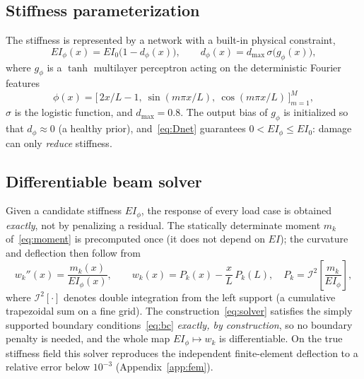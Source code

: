 \documentclass[11pt]{article}
\newcommand{\EI}{\mathit{EI}}
\begin{document}
\subsection{Stiffness parameterization}
The stiffness is represented by a network with a built-in physical constraint,
\begin{equation}
  \EI_\phi(x) = \EI_0\bigl(1 - d_\phi(x)\bigr), \qquad
  d_\phi(x) = d_{\max}\,\sigma\!\bigl(g_\phi(x)\bigr),
  \label{eq:Dnet}
\end{equation}
where $g_\phi$ is a $\tanh$ multilayer perceptron acting on the deterministic
Fourier features
\[
  \phi(x)=\bigl[\,2x/L-1,\ \sin(m\pi x/L),\ \cos(m\pi x/L)\,\bigr]_{m=1}^{M},
\]
$\sigma$ is the logistic function, and $d_{\max}{=}0.8$. The output bias of $g_\phi$
is initialized so that $d_\phi\approx 0$ (a healthy prior), and~\eqref{eq:Dnet}
guarantees $0<\EI_\phi\le\EI_0$: damage can only \emph{reduce} stiffness.

\subsection{Differentiable beam solver}
Given a candidate stiffness $\EI_\phi$, the response of every load case is obtained
\emph{exactly}, not by penalizing a residual. The statically determinate moment
$m_k$ of~\eqref{eq:moment} is precomputed once (it does not depend on $\EI$); the
curvature and deflection then follow from
\begin{equation}
  w_k''(x) = \frac{m_k(x)}{\EI_\phi(x)}, \qquad
  w_k(x) = P_k(x) - \frac{x}{L}\,P_k(L), \quad
  P_k = \mathcal{I}^2\!\left[\frac{m_k}{\EI_\phi}\right],
  \label{eq:solver}
\end{equation}
where $\mathcal{I}^2[\cdot]$ denotes double integration from the left support
(a cumulative trapezoidal sum on a fine grid). The construction~\eqref{eq:solver}
satisfies the simply supported boundary conditions~\eqref{eq:bc} \emph{exactly, by
construction}, so no boundary penalty is needed, and the whole map
$\EI_\phi\!\mapsto\! w_k$ is differentiable. On the true stiffness field this solver
reproduces the independent finite-element deflection to a relative error below
$10^{-3}$ (Appendix~\ref{app:fem}).
\end{document}
